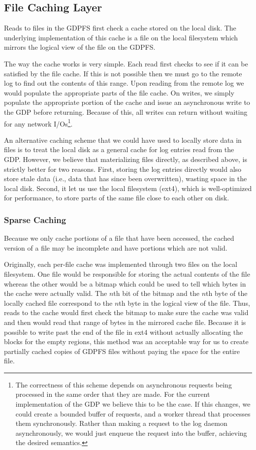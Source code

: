 \documentclass{acm_proc_article-sp}
\begin{document}
\subsection{File Caching Layer}\label{sec:implementation_file_cache}
Reads to files in the GDPFS first check a cache stored on the local disk. The underlying implementation of this cache is a file on the local filesystem which mirrors the logical view of the file on the GDPFS.

The way the cache works is very simple. Each read first checks to see if it can be satisfied by the file cache. If this is not possible then we must go to the remote log to find out the contents of this range. Upon reading from the remote log we would populate the appropriate parts of the file cache. On writes, we simply populate the appropriate portion of the cache and issue an asynchronous write to the GDP before returning. Because of this, all writes can return without waiting for any network I/Os\footnote{The correctness of this scheme depends on asynchronous requests being processed in the same order that they are made. For the current implementation of the GDP we believe this to be the case. If this changes, we could create a bounded buffer of requests, and a worker thread that processes them synchronously. Rather than making a request to the log daemon asynchronously, we would just enqueue the request into the buffer, achieving the desired semantics.}.

An alternative caching scheme that we could have used to locally store data in files is to treat the local disk as a general cache for log entries read from the GDP. However, we believe that materializing files directly, as described above, is strictly better for two reasons. First, storing the log entries directly would also store stale data (i.e., data that has since been overwritten), wasting space in the local disk. Second, it let us use the local filesystem (ext4), which is well-optimized for performance, to store parts of the same file close to each other on disk.

\subsubsection{Sparse Caching}
Because we only cache portions of a file that have been accessed, the cached version of a file may be incomplete and have portions which are not valid.

Originally, each per-file cache was implemented through two files on the local filesystem. One file would be responsible for storing the actual contents of the file whereas the other would be a bitmap which could be used to tell which bytes in the cache were actually valid. The $n$th bit of the bitmap and the $n$th byte of the locally cached file correspond to the $n$th byte in the logical view of the file. Thus, reads to the cache would first check the bitmap to make sure the cache was valid and then would read that range of bytes in the mirrored cache file. Because it is possible to write past the end of the file in ext4 without actually allocating the blocks for the empty regions, this method was an acceptable way for us to create partially cached copies of GDPFS files without paying the space for the entire file.
\end{document}
